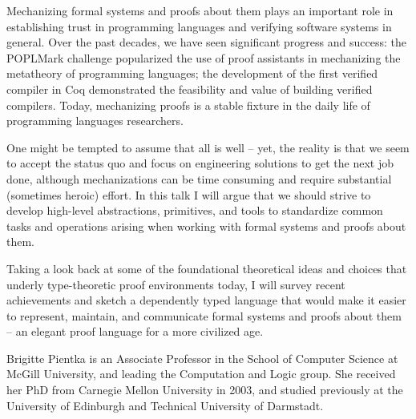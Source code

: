 \newpage



\talkabstract Mechanizing formal systems and proofs about them plays an
important role in establishing trust in programming languages and verifying
software systems in general. Over the past decades, we have seen significant
progress and success: the POPLMark challenge popularized the use of proof
assistants in mechanizing the metatheory of programming languages; the
development of the first verified compiler in Coq demonstrated the feasibility
and value of building verified compilers. Today, mechanizing proofs is a
stable fixture in the daily life of programming languages researchers.

One might be tempted to assume that all is well – yet, the reality is that we
seem to accept the status quo and focus on engineering solutions to get the
next job done, although mechanizations can be time consuming and require
substantial (sometimes heroic) effort. In this talk I will argue that we
should strive to develop high-level abstractions, primitives, and tools to
standardize common tasks and operations arising when working with formal
systems and proofs about them.

Taking a look back at some of the foundational theoretical ideas and choices
that underly type-theoretic proof environments today, I will survey recent
achievements and sketch a dependently typed language that would make it easier
to represent, maintain, and communicate formal systems and proofs about them –
an elegant proof language for a more civilized age.


\bio Brigitte Pientka is an Associate Professor in the School of Computer
Science at McGill University, and leading the Computation and Logic group. She
received her PhD from Carnegie Mellon University in 2003, and studied
previously at the University of Edinburgh and Technical University of
Darmstadt.

\newpage

